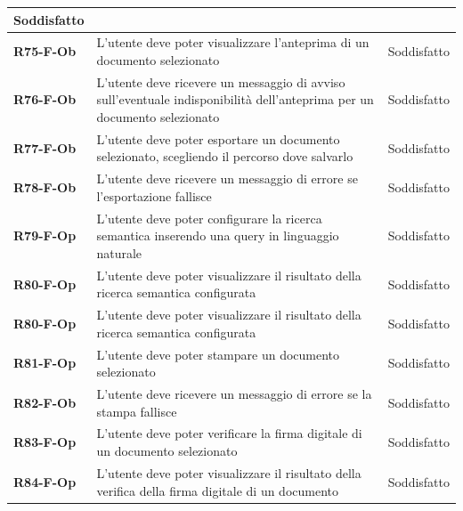 \documentclass[a4paper,12pt]{article}
\begin{document}
{{{\begin{longtable}{|>{\centering\arraybackslash}m{}|>{\centering\arraybackslash}m{}|>{\centering\arraybackslash}m{}|}
                Soddisfatto \\ 
                \hline
                \textbf{R75-F-Ob} & L'utente deve poter visualizzare l'anteprima di un documento selezionato & 
                Soddisfatto \\ 
                \hline
                \textbf{R76-F-Ob} & L'utente deve ricevere un messaggio di avviso sull'eventuale indisponibilità dell'anteprima per un documento selezionato & 
                Soddisfatto \\ 
                \hline
                \textbf{R77-F-Ob} & L'utente deve poter esportare un documento selezionato, scegliendo il percorso dove salvarlo & 
                Soddisfatto \\ 
                \hline
                \textbf{R78-F-Ob} & L'utente deve ricevere un messaggio di errore se l'esportazione fallisce & 
                Soddisfatto \\ 
                \hline
                \textbf{R79-F-Op} & L'utente deve poter configurare la ricerca semantica inserendo una query in linguaggio naturale & 
                Soddisfatto \\ 
                \hline
                \textbf{R80-F-Op} & L'utente deve poter visualizzare il risultato della ricerca semantica configurata & 
                Soddisfatto \\ 
                \hline
                \hline
                \textbf{R80-F-Op} & L'utente deve poter visualizzare il risultato della ricerca semantica configurata & 
                Soddisfatto \\ 
                \hline
                \textbf{R81-F-Op} & L'utente deve poter stampare un documento selezionato & 
                Soddisfatto \\ 
                \hline
                \textbf{R82-F-Ob} & L'utente deve ricevere un messaggio di errore se la stampa fallisce & 
                Soddisfatto \\ 
                \hline
                \textbf{R83-F-Op} & L'utente deve poter verificare la firma digitale di un documento selezionato & 
                Soddisfatto \\ 
                \hline
                \textbf{R84-F-Op} & L'utente deve poter visualizzare il risultato della verifica della firma digitale di un documento & 
                Soddisfatto \\ 
                \hline
            \end{longtable}
        }
}}
\end{document}
